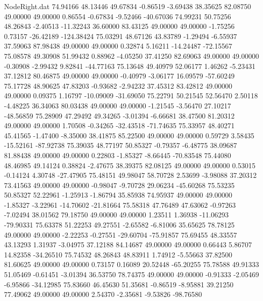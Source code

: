 \begin{filecontents}{NodeRight.dat}
  74.94166   48.13446   49.67834    -0.86519   -3.69438   38.35625   82.08750   49.00000   49.00000    0.86554   -0.67834   -9.52466  -40.67036
  74.99231   50.75256   48.26843    -2.40513  -11.32243   36.60000   83.43125   49.00000   49.00000   -1.75256    0.73157  -26.42189 -124.38424
  75.03291   48.67126   43.83789    -1.29494   -6.55937   37.59063   87.98438   49.00000   49.00000    0.32874    5.16211  -14.24487  -72.15567
  75.08578   49.30908   51.99432     0.88962   -4.05250   37.41250   82.69063   49.00000   49.00000   -0.30908   -2.99432    9.82841  -44.77163
  75.13648   49.40979   52.06177     1.46262   -5.23431   37.12812   80.46875   49.00000   49.00000   -0.40979   -3.06177   16.09579  -57.60249
  75.17728   48.90625   47.83203    -0.93682   -2.94232   37.45312   83.42812   49.00000   49.00000    0.09375    1.16797  -10.09009  -31.69050
  75.22791   50.21545   52.56470     2.50118   -4.48225   36.34063   80.03438   49.00000   49.00000   -1.21545   -3.56470   27.10217  -48.56859
  75.28909   47.29492   49.34265    -3.01394   -6.66681   38.47500   81.20312   49.00000   49.00000    1.70508   -0.34265  -32.43518  -71.74635
  75.33957   48.40271   45.41565    -1.47400   -8.35000   38.41875   85.22500   49.00000   49.00000    0.59729    3.58435  -15.52161  -87.92738
  75.39035   48.77197   50.85327    -0.79357   -6.48775   38.09687   81.88438   49.00000   49.00000    0.22803   -1.85327   -8.66445  -70.83548
  75.44080   48.46985   49.14124     0.38824   -2.47675   38.39375   82.08125   49.00000   49.00000    0.53015   -0.14124    4.30748  -27.47905
  75.48151   49.98047   58.70728     2.53699   -3.98088   37.20312   73.41563   49.00000   49.00000   -0.98047   -9.70728   29.06234  -45.60268
  75.53235   50.85327   52.22961    -1.25913   -1.86794   35.85938   74.95937   49.00000   49.00000   -1.85327   -3.22961  -14.70602  -21.81664
  75.58318   47.76489   47.63062    -0.97263   -7.02494   38.01562   79.18750   49.00000   49.00000    1.23511    1.36938  -11.06293  -79.90331
  75.63378   51.22253   49.27551    -2.65582   -6.81006   35.65625   78.78125   49.00000   49.00000   -2.22253   -0.27551  -29.60704  -75.91857
  75.69455   48.33557   43.13293     1.31937   -3.04975   37.12188   84.14687   49.00000   49.00000    0.66443    5.86707   14.82358  -34.26510
  75.74532   48.26843   48.83911     1.74912   -5.55663   37.82500   81.60625   49.00000   49.00000    0.73157    0.16089   20.52448  -65.20255
  75.78588   49.91333   51.05469    -0.61451   -3.01394   36.53750   78.74375   49.00000   49.00000   -0.91333   -2.05469   -6.95866  -34.12985
  75.83660   46.45630   51.35681    -0.86519   -8.95881   39.21250   77.49062   49.00000   49.00000    2.54370   -2.35681   -9.53826  -98.76580

\end{filecontents}
